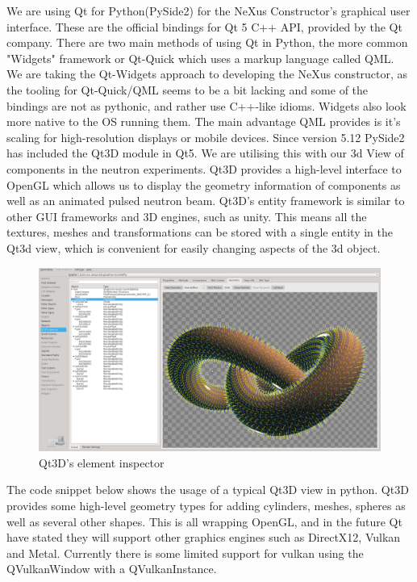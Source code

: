 We are using Qt for Python(PySide2) for the NeXus Constructor's graphical user interface. These are the official bindings for Qt 5 C++ API, provided by the Qt company.
\bigskip
There are two main methods of using Qt in Python, the more common "Widgets" framework or Qt-Quick which uses a markup language called QML.
We are taking the Qt-Widgets approach to developing the NeXus constructor, as the tooling for Qt-Quick/QML seems to be a bit lacking and some of the bindings are not as pythonic, and rather use C++-like idioms. Widgets also look more native to the OS running them. The main advantage QML provides is it's scaling for high-resolution displays or mobile devices.
\bigskip
Since version 5.12 PySide2 has included the Qt3D module in Qt5. We are utilising this with our 3d View of components in the neutron experiments. Qt3D provides a high-level interface to OpenGL which allows us to display the geometry information of components as well as an animated pulsed neutron beam. Qt3D's entity framework is similar to other GUI frameworks and 3D engines, such as unity. This means all the textures, meshes and transformations can be stored with a single entity in the Qt3d view, which is convenient for easily changing aspects of the 3d object. 
\bigskip
\begin{figure}
\caption{Qt3D's element inspector}
\includegraphics[width=\linewidth]{qt3d.png}
\end{figure}
\bigskip

The code snippet below shows the usage of a typical Qt3D view in python. Qt3D provides some high-level geometry types for adding cylinders, meshes, spheres as well as several other shapes. This is all wrapping OpenGL, and in the future Qt have stated they will support other graphics engines such as DirectX12, Vulkan and Metal. Currently there is some limited support for vulkan using the QVulkanWindow with a QVulkanInstance.


